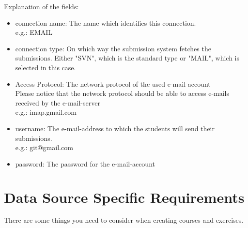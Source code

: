 \documentclass[10pt,a4paper, titlepage, toc=idx]{scrreprt}
\theoremstyle{definition}
\theoremstyle{plain}
\newcommand*{\product}{Grit}
\begin{document}
Explanation of the fields:
\begin{itemize}
\item connection name: The name which identifies this connection.\\
e.g.: EMAIL

\item connection type: On which way the submission system fetches the submissions. Either "SVN", which is the standard type or "MAIL", which is selected in this case.

\item Access Protocol: The network protocol of the used e-mail account\\
Please notice that the network protocol should be able to access e-mails received by the e-mail-server\\
e.g.: imap.gmail.com

\item username: The e-mail-address to which the students will send their submissions.\\
e.g.: git@gmail.com

\item password: The password for the e-mail-account
\end{itemize}

       \section{Data Source Specific Requirements}\label{dataSourceSpecific} 
        There are some things you need to consider when creating courses and exercises.
  	
\end{document}
